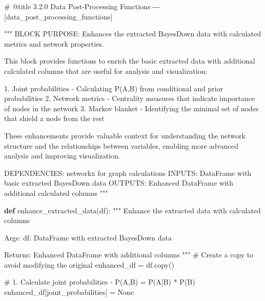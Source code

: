 \documentclass[
  11pt,
  letterpaper,
]{book}
\newenvironment{Shaded}{\begin{snugshade}}{\end{snugshade}}
\newcommand{\CommentTok}[1]{\textcolor[rgb]{0.37,0.37,0.37}{#1}}
\newcommand{\KeywordTok}[1]{\textcolor[rgb]{0.00,0.23,0.31}{\textbf{#1}}}
\newcommand{\NormalTok}[1]{\textcolor[rgb]{0.00,0.23,0.31}{#1}}
\newcommand{\OperatorTok}[1]{\textcolor[rgb]{0.37,0.37,0.37}{#1}}
\newcommand{\StringTok}[1]{\textcolor[rgb]{0.13,0.47,0.30}{#1}}
\newcommand{\VariableTok}[1]{\textcolor[rgb]{0.07,0.07,0.07}{#1}}
\begin{document}
\label{data_post_processing_functions}
\begin{Shaded}
\begin{Highlighting}[]
\CommentTok{\# @title 3.2.0 Data Post{-}Processing Functions {-}{-}{-} [data\_post\_processing\_functions]}

\CommentTok{"""}
\CommentTok{BLOCK PURPOSE: Enhances the extracted BayesDown data with calculated metrics and network properties.}

\CommentTok{This block provides functions to enrich the basic extracted data with additional}
\CommentTok{calculated columns that are useful for analysis and visualization:}

\CommentTok{1. Joint probabilities {-} Calculating P(A,B) from conditional and prior probabilities}
\CommentTok{2. Network metrics {-} Centrality measures that indicate importance of nodes in the network}
\CommentTok{3. Markov blanket {-} Identifying the minimal set of nodes that shield a node from the rest}

\CommentTok{These enhancements provide valuable context for understanding the network structure}
\CommentTok{and the relationships between variables, enabling more advanced analysis and}
\CommentTok{improving visualization.}

\CommentTok{DEPENDENCIES: networkx for graph calculations}
\CommentTok{INPUTS: DataFrame with basic extracted BayesDown data}
\CommentTok{OUTPUTS: Enhanced DataFrame with additional calculated columns}
\CommentTok{"""}

\KeywordTok{def}\NormalTok{ enhance\_extracted\_data(df):}
    \CommentTok{"""}
\CommentTok{    Enhance the extracted data with calculated columns}

\CommentTok{    Args:}
\CommentTok{        df: DataFrame with extracted BayesDown data}

\CommentTok{    Returns:}
\CommentTok{        Enhanced DataFrame with additional columns}
\CommentTok{    """}
    \CommentTok{\# Create a copy to avoid modifying the original}
\NormalTok{    enhanced\_df }\OperatorTok{=}\NormalTok{ df.copy()}

    \CommentTok{\# 1. Calculate joint probabilities {-} P(A,B) = P(A|B) * P(B)}
\NormalTok{    enhanced\_df[}\StringTok{\textquotesingle{}joint\_probabilities\textquotesingle{}}\NormalTok{] }\OperatorTok{=} \VariableTok{None}


\end{Highlighting}
\end{Shaded}
\end{document}
